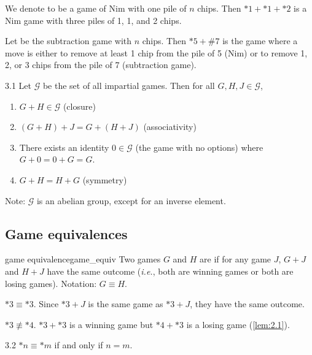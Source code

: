 \documentclass[12pt,letterpaper]{report}
\begin{document}
\begin{ex}
  We denote  to be a game of Nim with one pile of $n$ chips.
  Then $*1 + *1 + *2$ is a Nim game with three piles of 1, 1, and 2 chips.
\end{ex}

\begin{ex}
  Let  be the subtraction game with $n$ chips.
  Then $*5 + \#7$ is the game where a move is either to remove at least 1 chip from the pile of 5
  (Nim) or to remove 1, 2, or 3 chips from the pile of 7 (subtraction game).
\end{ex}

\begin{lem}{}{3.1}
  Let $\mathcal{G}$ be the set of all impartial games.
  Then for all $G, H, J \in \mathcal{G}$,
  \begin{enumerate}
    \item $G + H \in \mathcal{G}$ (closure)
    \item $(G + H) + J = G + (H + J)$ (associativity)
    \item There exists an identity $0 \in \mathcal{G}$ (the game with no options) where
      $G + 0 = 0 + G = G$.
    \item $G + H = H + G$ (symmetry)
  \end{enumerate}
\end{lem}

Note: $\mathcal{G}$ is an abelian group, except for an inverse element.

\pagebreak
\subsection{Game equivalences}

\begin{defn}{game equivalence}{game_equiv}
  Two games $G$ and $H$ are  if for any game $J$, $G + J$ and $H + J$ have the
  same outcome (\emph{i.e.}, both are winning games or both are losing games).
  Notation: $G \equiv H$.
\end{defn}

\begin{ex}
  $*3 \equiv *3$.
  Since $*3 + J$ is the same game as $*3 + J$, they have the same outcome.

  $*3 \not\equiv *4$.
  $*3 + *3$ is a winning game but $*4 + *3$ is a losing game (\cref{lem:2.1}).
\end{ex}

\begin{lem}{}{3.2}
  $*n \equiv *m$ if and only if $n = m$.
\end{lem}
\end{document}
